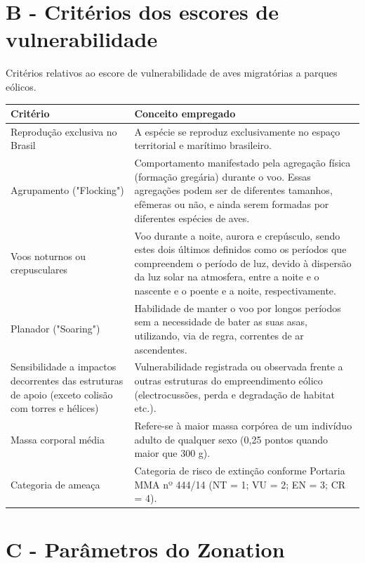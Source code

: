 \documentclass[
  oneside]{scrbook}
\begin{document}
\newpage

\hypertarget{b---crituxe9rios-dos-escores-de-vulnerabilidade}{%
\chapter{B - Critérios dos escores de vulnerabilidade}\label{b---crituxe9rios-dos-escores-de-vulnerabilidade}}

Critérios relativos ao escore de vulnerabilidade de aves migratórias a parques eólicos.

\begin{longtable}[t]{>{\raggedright\arraybackslash}p{5cm}>{\raggedright\arraybackslash}p{10cm}}
\toprule
Critério & Conceito empregado\\
\midrule
Reprodução exclusiva no Brasil & A espécie se reproduz exclusivamente no espaço territorial e marítimo brasileiro.\\
Agrupamento ("Flocking") & Comportamento manifestado pela agregação física (formação gregária) durante o voo. Essas agregações podem ser de diferentes tamanhos, efêmeras ou não, e ainda serem formadas por diferentes espécies de aves.\\
Voos noturnos ou crepusculares & Voo durante a noite, aurora e crepúsculo, sendo estes dois últimos definidos como os períodos que compreendem o período de luz, devido à dispersão da luz solar na atmosfera, entre a noite e o nascente e o poente e a noite, respectivamente.\\
Planador ("Soaring") & Habilidade de manter o voo por longos períodos sem a necessidade de bater as suas asas, utilizando, via de regra, correntes de ar ascendentes.\\
Sensibilidade a impactos decorrentes das estruturas de apoio (exceto colisão com torres e hélices) & Vulnerabilidade registrada ou observada frente a outras estruturas do empreendimento eólico (electrocussões, perda e degradação de habitat etc.).\\
\addlinespace
Massa corporal média & Refere-se à maior massa corpórea de um indivíduo adulto de qualquer sexo (0,25 pontos quando maior que 300 g).\\
Categoria de ameaça & Categoria de risco de extinção conforme Portaria MMA nº 444/14 (NT = 1; VU = 2; EN = 3; CR = 4).\\
\bottomrule
\end{longtable}

\newpage

\hypertarget{c---paruxe2metros-do-zonation}{%
\chapter{C - Parâmetros do Zonation}\label{c---paruxe2metros-do-zonation}}
\end{document}

